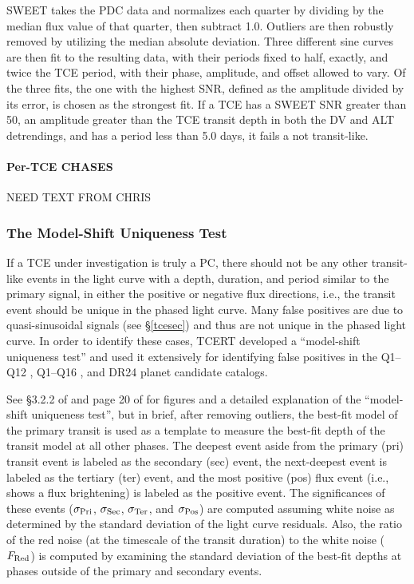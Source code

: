 SWEET takes the PDC data and normalizes each quarter by dividing by the median flux value of that quarter, then subtract 1.0. Outliers are then robustly removed by utilizing the median absolute deviation. Three different sine curves are then fit to the resulting data, with their periods fixed to half, exactly, and twice the TCE period, with their phase, amplitude, and offset allowed to vary. Of the three fits, the one with the highest SNR, defined as the amplitude divided by its error, is chosen as the strongest fit. If a TCE has a SWEET SNR greater than 50, an amplitude greater than the TCE transit depth in both the DV and ALT detrendings, and has a period less than 5.0 days, it fails a not transit-like.




\paragraph{Per-TCE CHASES}
\label{s:tcechases}
NEED TEXT FROM CHRIS




\subsubsection{The Model-Shift Uniqueness Test}
\label{s:ms}

If a TCE under investigation is truly a PC, there should not be any other transit-like events in the light curve with a depth, duration, and period similar to the primary signal, in either the positive or negative flux directions, i.e., the transit event should be unique in the phased light curve. Many false positives are due to quasi-sinusoidal signals (see \S\ref{tcesec}) and thus are not unique in the phased light curve. In order to identify these cases, TCERT developed a ``model-shift uniqueness test'' and used it extensively for identifying false positives in the Q1--Q12 \citep{Rowe2015a}, Q1--Q16 \citep{Mullally2015cat}, and DR24 \citep{Coughlin2016} planet candidate catalogs.

See \S3.2.2 of \citet{Rowe2015a} and page 20 of \citet{Coughlin2014b} for figures and a detailed explanation of the ``model-shift uniqueness test'', but in brief, after removing outliers, the best-fit model of the primary transit is used as a template to measure the best-fit depth of the transit model at all other phases. The deepest event aside from the primary (pri) transit event is labeled as the secondary (sec) event, the next-deepest event is labeled as the tertiary (ter) event, and the most positive (pos) flux event (i.e., shows a flux brightening) is labeled as the positive event. The significances of these events ($\sigma_{\rm Pri}$, $\sigma_{\rm Sec}$, $\sigma_{\rm Ter}$, and $\sigma_{\rm Pos}$) are computed assuming white noise as determined by the standard deviation of the light curve residuals. Also, the ratio of the red noise (at the timescale of the transit duration) to the white noise ($F_{\rm Red}$) is computed by examining the standard deviation of the best-fit depths at phases outside of the primary and secondary events.  

